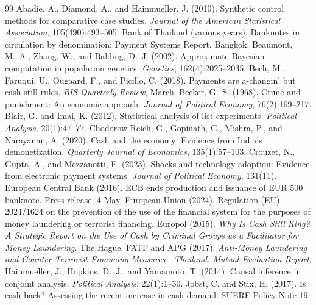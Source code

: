 \documentclass[11pt]{article}
\theoremstyle{definition}
\theoremstyle{remark}
\begin{document}
\begin{thebibliography}{99}\small
\setlength{\itemsep}{1pt}
 Abadie, A., Diamond, A., and Hainmueller, J. (2010). Synthetic control methods for comparative case studies. \textit{Journal of the American Statistical Association}, 105(490):493--505.
 Bank of Thailand (various years). Banknotes in circulation by denomination; Payment Systems Report. Bangkok.
 Beaumont, M.~A., Zhang, W., and Balding, D.~J. (2002). Approximate Bayesian computation in population genetics. \textit{Genetics}, 162(4):2025--2035.
 Bech, M., Faruqui, U., Ougaard, F., and Picillo, C. (2018). Payments are a-changin' but cash still rules. \textit{BIS Quarterly Review}, March.
 Becker, G.~S. (1968). Crime and punishment: An economic approach. \textit{Journal of Political Economy}, 76(2):169--217.
 Blair, G. and Imai, K. (2012). Statistical analysis of list experiments. \textit{Political Analysis}, 20(1):47--77.
 Chodorow-Reich, G., Gopinath, G., Mishra, P., and Narayanan, A. (2020). Cash and the economy: Evidence from India's demonetization. \textit{Quarterly Journal of Economics}, 135(1):57--103.
 Crouzet, N., Gupta, A., and Mezzanotti, F. (2023). Shocks and technology adoption: Evidence from electronic payment systems. \textit{Journal of Political Economy}, 131(11).
 European Central Bank (2016). ECB ends production and issuance of EUR 500 banknote. Press release, 4 May.
 European Union (2024). Regulation (EU) 2024/1624 on the prevention of the use of the financial system for the purposes of money laundering or terrorist financing.
 Europol (2015). \textit{Why Is Cash Still King? A Strategic Report on the Use of Cash by Criminal Groups as a Facilitator for Money Laundering}. The Hague.
 FATF and APG (2017). \textit{Anti-Money Laundering and Counter-Terrorist Financing Measures---Thailand: Mutual Evaluation Report}.
 Hainmueller, J., Hopkins, D.~J., and Yamamoto, T. (2014). Causal inference in conjoint analysis. \textit{Political Analysis}, 22(1):1--30.
 Jobst, C. and Stix, H. (2017). Is cash back? Assessing the recent increase in cash demand. SUERF Policy Note 19.

\end{thebibliography}
\end{document}
